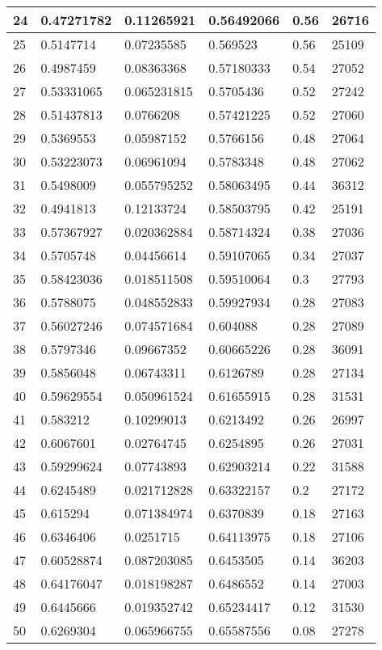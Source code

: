 \begin{longtable}{|l|l|l|l|l|l|}
24 & 0.47271782 & 0.11265921 & 0.56492066 & 0.56 & 26716 \\ \hline 
25 & 0.5147714 & 0.07235585 & 0.569523 & 0.56 & 25109 \\ \hline 
26 & 0.4987459 & 0.08363368 & 0.57180333 & 0.54 & 27052 \\ \hline 
27 & 0.53331065 & 0.065231815 & 0.5705436 & 0.52 & 27242 \\ \hline 
28 & 0.51437813 & 0.0766208 & 0.57421225 & 0.52 & 27060 \\ \hline 
29 & 0.5369553 & 0.05987152 & 0.5766156 & 0.48 & 27064 \\ \hline 
30 & 0.53223073 & 0.06961094 & 0.5783348 & 0.48 & 27062 \\ \hline 
31 & 0.5498009 & 0.055795252 & 0.58063495 & 0.44 & 36312 \\ \hline 
32 & 0.4941813 & 0.12133724 & 0.58503795 & 0.42 & 25191 \\ \hline 
33 & 0.57367927 & 0.020362884 & 0.58714324 & 0.38 & 27036 \\ \hline 
34 & 0.5705748 & 0.04456614 & 0.59107065 & 0.34 & 27037 \\ \hline 
35 & 0.58423036 & 0.018511508 & 0.59510064 & 0.3 & 27793 \\ \hline 
36 & 0.5788075 & 0.048552833 & 0.59927934 & 0.28 & 27083 \\ \hline 
37 & 0.56027246 & 0.074571684 & 0.604088 & 0.28 & 27089 \\ \hline 
38 & 0.5797346 & 0.09667352 & 0.60665226 & 0.28 & 36091 \\ \hline 
39 & 0.5856048 & 0.06743311 & 0.6126789 & 0.28 & 27134 \\ \hline 
40 & 0.59629554 & 0.050961524 & 0.61655915 & 0.28 & 31531 \\ \hline 
41 & 0.583212 & 0.10299013 & 0.6213492 & 0.26 & 26997 \\ \hline 
42 & 0.6067601 & 0.02764745 & 0.6254895 & 0.26 & 27031 \\ \hline 
43 & 0.59299624 & 0.07743893 & 0.62903214 & 0.22 & 31588 \\ \hline 
44 & 0.6245489 & 0.021712828 & 0.63322157 & 0.2 & 27172 \\ \hline 
45 & 0.615294 & 0.071384974 & 0.6370839 & 0.18 & 27163 \\ \hline 
46 & 0.6346406 & 0.0251715 & 0.64113975 & 0.18 & 27106 \\ \hline 
47 & 0.60528874 & 0.087203085 & 0.6453505 & 0.14 & 36203 \\ \hline 
48 & 0.64176047 & 0.018198287 & 0.6486552 & 0.14 & 27003 \\ \hline 
49 & 0.6445666 & 0.019352742 & 0.65234417 & 0.12 & 31530 \\ \hline 
50 & 0.6269304 & 0.065966755 & 0.65587556 & 0.08 & 27278 \\ \hline 
\end{longtable}